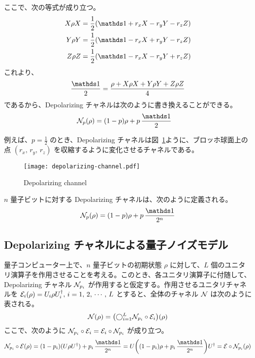 ここで、次の等式が成り立つ。
\begin{align}
    X{\rho}X &= \frac12(\bbid + r_x X - r_y Y - r_z Z)\nonumber\\
    Y{\rho}Y &= \frac12(\bbid - r_x X + r_y Y - r_z Z)\\
    Z{\rho}Z &= \frac12(\bbid - r_x X - r_y Y + r_z Z)\nonumber
\end{align}
これより、
\begin{align}
    \frac{\bbid}{2} = \frac{\rho + X\rho X + Y\rho Y + Z\rho Z}{4}
\end{align}
であるから、Depolarizing チャネルは次のように書き換えることができる。
\begin{align}
    \calN_p(\rho)
    &= (1 - p)\rho + p\,\frac{\bbid}{2}
\end{align}

例えば、$p  = \frac12$ のとき、Depolarizing チャネルは図~\ref{fig:depolarizing-channel}ように、ブロッホ球面上の点 $(r_x,\,r_y,\,r_z)$ を収縮するように変化させるチャネルである。
\begin{figure}[H]
    \centering
    \texttt{[image: depolarizing-channel.pdf]}
    \caption{Depolarizing channel~\cite{nielsen2010quantum}}
    \label{fig:depolarizing-channel}
\end{figure}

$n$ 量子ビットに対する Depolarizing チャネルは、次のように定義される。
\begin{align}
    \calN_p(\rho) = (1 - p)\rho + p\,\frac{\bbid}{2^n}
\end{align}

\subsection*{Depolarizing チャネルによる量子ノイズモデル}
量子コンピューター上で、$n$ 量子ビットの初期状態 $\rho$ に対して、$L$ 個のユニタリ演算子を作用させることを考える。このとき、各ユニタリ演算子に付随して、Depolarizing チャネル $\mathcal{N}_{p_i}$ が作用すると仮定する。作用させるユニタリチャネルを $\mathcal{E}_i(\rho) = U_i\rho U_i^\dagger,\, i = 1,\,2,\,\cdots,\,L$ とすると、全体のチャネル $\mathcal{N}$ は次のように表される。
\begin{align}
    \mathcal{N}(\rho) = \qty(\bigcirc_{i=1}^L \mathcal{N}_{p_i} \circ \mathcal{E}_i)(\rho)
\end{align}
ここで、次のように $\mathcal{N}_{p_i} \circ \mathcal{E}_i = \mathcal{E}_i \circ \mathcal{N}_{p_i}$ が成り立つ。
\begin{align}
    \calN_{p_i} \circ \calE(\rho)
    = (1-p_i)(U\rho U\dg) + p_i\,\frac{\bbid}{2^n}
    = U\qty((1-p_i)\rho + p_i\,\frac{\bbid}{2^n})U\dg
    = \calE \circ \calN_{p_i}(\rho)
\end{align}

